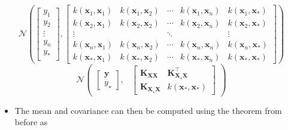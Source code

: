 \documentclass[9pt,hyperref={pdfpagelabels=false},xcolor=table]{beamer}
\begin{document}
\begin{frame}
    \[
        \mathcal{N} \left(
        \begin{bmatrix}
                y_1      \\
                y_2      \\
                \vdots   \\
                y_n      \\
                y_{\ast} \\
            \end{bmatrix} ,
        \begin{bmatrix}
                k (\bm{x}_1,\bm{x}_1)      & k (\bm{x}_1,\bm{x}_2)      & \cdots & k (\bm{x}_1,\bm{x}_n)      & k (\bm{x}_{1},\bm{x}_{\ast})    \\
                k (\bm{x}_2,\bm{x}_1)      & k (\bm{x}_2,\bm{x}_2)      & \cdots & k (\bm{x}_2,\bm{x}_n)      & k (\bm{x}_{2},\bm{x}_{\ast})    \\
                \vdots                     &                            & \ddots &                            & \vdots                          \\
                k (\bm{x}_n,\bm{x}_1)      & k (\bm{x}_n,\bm{x}_2)      & \cdots & k (\bm{x}_n,\bm{x}_n)      & k (\bm{x}_n,\bm{x}_{\ast})      \\
                k (\bm{x}_{\ast},\bm{x}_1) & k (\bm{x}_{\ast},\bm{x}_2) & \cdots & k (\bm{x}_{\ast},\bm{x}_n) & k (\bm{x}_{\ast},\bm{x}_{\ast})
            \end{bmatrix}
        \right)
    \]
    \pause
    \[
        \mathcal{N}
        \begin{pmatrix}
            {
                \begin{bmatrix}
                    \bm{y} \\
                    y_{\star}
                \end{bmatrix}
            }
            , &
            {
                    \begin{bmatrix}
                        \bm{K_{XX}}         & \bm{K_{X_{\star}X}^{\intercal}} \\
                        \bm{K_{X_{\star}X}} & k (\bm{x}_{\ast},\bm{x}_{\ast})
                    \end{bmatrix}
                }
        \end{pmatrix}
    \]
    \pause
    \begin{itemize}
        \item The mean and covariance can then be computed using the theorem from before as

\end{itemize}
\end{frame}
\end{document}

